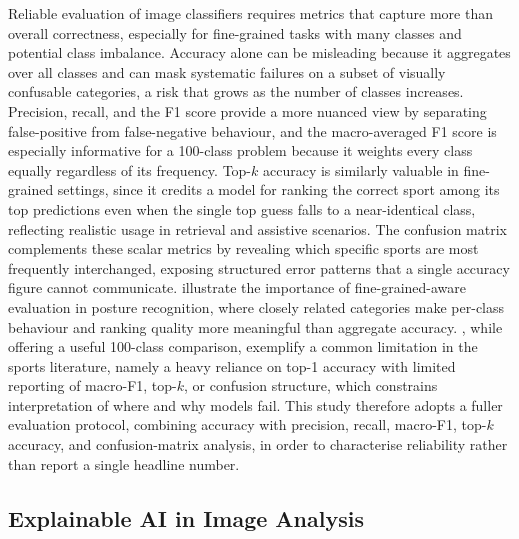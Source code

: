 Reliable evaluation of image classifiers requires metrics that capture more than overall correctness, especially for fine-grained tasks with many classes and potential class imbalance.
Accuracy alone can be misleading because it aggregates over all classes and can mask systematic failures on a subset of visually confusable categories, a risk that grows as the number of classes increases.
Precision, recall, and the F1 score provide a more nuanced view by separating false-positive from false-negative behaviour, and the macro-averaged F1 score is especially informative for a 100-class problem because it weights every class equally regardless of its frequency.
Top-$k$ accuracy is similarly valuable in fine-grained settings, since it credits a model for ranking the correct sport among its top predictions even when the single top guess falls to a near-identical class, reflecting realistic usage in retrieval and assistive scenarios.
The confusion matrix complements these scalar metrics by revealing which specific sports are most frequently interchanged, exposing structured error patterns that a single accuracy figure cannot communicate.
\citet{bera2023finegrained} illustrate the importance of fine-grained-aware evaluation in posture recognition, where closely related categories make per-class behaviour and ranking quality more meaningful than aggregate accuracy.
\citet{liu2024comparison}, while offering a useful 100-class comparison, exemplify a common limitation in the sports literature, namely a heavy reliance on top-1 accuracy with limited reporting of macro-F1, top-$k$, or confusion structure, which constrains interpretation of where and why models fail.
This study therefore adopts a fuller evaluation protocol, combining accuracy with precision, recall, macro-F1, top-$k$ accuracy, and confusion-matrix analysis, in order to characterise reliability rather than report a single headline number.

\subsection{Explainable AI in Image Analysis}
\label{subsec:xai}

